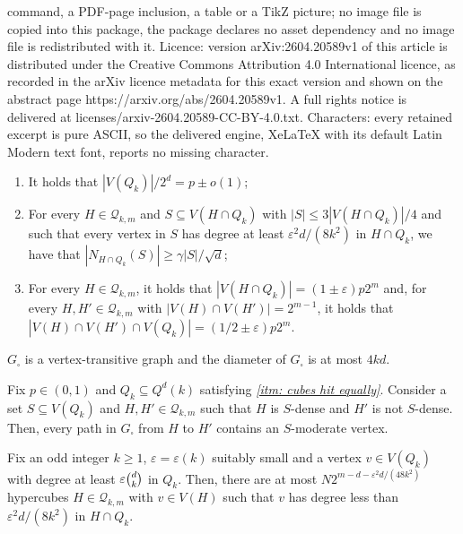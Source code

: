 \documentclass[10pt,a4paper]{amsart}
\newcommand{\cQ}{\mathcal{Q}}
\newcommand{\eps}{\varepsilon}
\begin{document}
command, a PDF-page inclusion, a table or a TikZ picture; no image file is copied into this package, the package declares no asset dependency and no image file is redistributed with it. Licence: version arXiv:2604.20589v1 of this article is distributed under the Creative Commons Attribution 4.0 International licence, as recorded in the arXiv licence metadata for this exact version and shown on the abstract page https://arxiv.org/abs/2604.20589v1. A full rights notice is delivered at licenses/arxiv-2604.20589-CC-BY-4.0.txt. Characters: every retained excerpt is pure ASCII, so the delivered engine, XeLaTeX with its default Latin Modern text font, reports no missing character.
\begin{enumerate}[label=(\roman*), ref=(\roman*)]
    \item\label{itm: p} It holds that $|V(Q_k)|/2^d=p\pm o(1)$; 
    \item\label{itm: expansion} For every $H\in\cQ_{k,m}$ 
    and $S\subseteq V(H\cap  Q_k)$ with $|S|\leq 3|V(H\cap  Q_k)|/4$ and such that every vertex in $S$ has degree at least $\varepsilon^2d/(8k^2)$ in $H\cap  Q_k$, we have that $|N_{H\cap  Q_k}(S)|\ge \gamma|S|/\sqrt d$;
    \item\label{itm: cubes hit equally} For every $H\in\cQ_{k,m}$, it holds that $|V(H\cap Q_k)|= (1\pm \varepsilon)p2^m$ and, for every $H,H'\in\cQ_{k,m}$ with $|V(H)\cap V(H')|=2^{m-1}$, it holds that $|V(H)\cap V(H')\cap V(Q_k)|= (1/2\pm\varepsilon)p2^{m}$.
\end{enumerate}

\begin{lemma}\label{lem:diameter}
$G_{\square}$ is a vertex-transitive graph and the diameter of $G_{\square}$ is at most $4kd$. 
\end{lemma}

\begin{lemma}\label{lem:cont}
Fix $p\in(0,1)$ and $Q_k\subseteq Q^d(k)$ satisfying \emph{\ref{itm: cubes hit equally}}.
Consider a set $S\subseteq V(Q_k)$ and $H,H'\in\cQ_{k,m}$ such that $H$ is $S$-dense and $H'$ is not $S$-dense. 
Then, every path in $G_{\square}$ from $H$ to $H'$ contains an $S$-moderate vertex.
\end{lemma}

\begin{lemma}\label{lem: vertex is good}
Fix an odd integer $k\ge 1$, $\eps=\eps(k)$ suitably small and a vertex $v\in V(Q_k)$ with degree at least $\varepsilon \tbinom{d}{k}$ in $Q_k$. Then, there are at most $N2^{m-d-\varepsilon^2 d/(48k^2)}$ hypercubes $H\in\cQ_{k,m}$ with $v\in V(H)$ such that $v$ has degree less than $\varepsilon^2 d/(8k^2)$ in $H\cap Q_k$.
\end{lemma}
\end{document}
